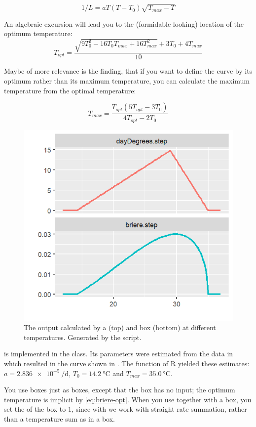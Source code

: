 \begin{equation}
  1/L = aT(T-T_0)\sqrt{T_{max}-T} \label{eq:briere}
\end{equation}

An algebraic excursion will lead you to the (formidable looking) location of the optimum temperature:
\begin{equation}
T_{opt}= \frac{\sqrt{9T_0^2 - 16T_0T_{max} + 16T_{max}^2} + 3T_0 + 4T_{max}}{10} \label{eq:briere-opt}
\end{equation}

Maybe of more relevance is the finding, that if you want to define the curve by its optimum rather than its maximum temperature, you can calculate the maximum temperature from the optimal temperature:

\begin{equation}
T_{max} = \frac {T_{opt}(5T_{opt} - 3T_0)}{4T_{opt} - 2T_0}
\end{equation}


\begin{figure} [ht]
\centering
\includegraphics[width=.6\textwidth]{graphics/phys-dev-scale-2}
\caption{The  output calculated by a  (top) and  box (bottom) at different temperatures. Generated by the  script.} 
\label{fig:phys-dev-scale-2}
\end{figure}

 is implemented in the  class. Its parameters were estimated from the data in  which resulted in the curve shown in . The  function of R yielded these estimates: $a=\SI{2.836e-5}{\per\day}$, $T_0=\SI{14.2}{\celsius}$ and $T_{max}=\SI{35.0}{\celsius}$.

You use  boxes just as  boxes, except that the  box has no  input; the optimum temperature is implicit by \cref{eq:briere-opt}. When you use  together with a  box, you set the  of the  box to 1, since with  we work with straight rate summation, rather than a temperature sum as in a  box. 

